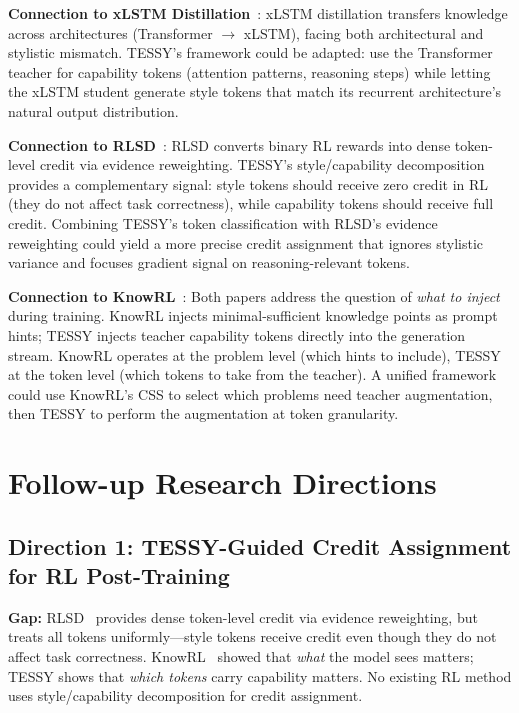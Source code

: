 \documentclass[11pt]{article}
\begin{document}
\textbf{Connection to xLSTM Distillation}~\cite{xlstm}: xLSTM distillation transfers knowledge across architectures (Transformer $\to$ xLSTM), facing both architectural and stylistic mismatch. TESSY's framework could be adapted: use the Transformer teacher for capability tokens (attention patterns, reasoning steps) while letting the xLSTM student generate style tokens that match its recurrent architecture's natural output distribution.

\textbf{Connection to RLSD}~\cite{rlsd}: RLSD converts binary RL rewards into dense token-level credit via evidence reweighting. TESSY's style/capability decomposition provides a complementary signal: style tokens should receive zero credit in RL (they do not affect task correctness), while capability tokens should receive full credit. Combining TESSY's token classification with RLSD's evidence reweighting could yield a more precise credit assignment that ignores stylistic variance and focuses gradient signal on reasoning-relevant tokens.

\textbf{Connection to KnowRL}~\cite{knowrl}: Both papers address the question of \textit{what to inject} during training. KnowRL injects minimal-sufficient knowledge points as prompt hints; TESSY injects teacher capability tokens directly into the generation stream. KnowRL operates at the problem level (which hints to include), TESSY at the token level (which tokens to take from the teacher). A unified framework could use KnowRL's CSS to select which problems need teacher augmentation, then TESSY to perform the augmentation at token granularity.

\section{Follow-up Research Directions}

\subsection{Direction 1: TESSY-Guided Credit Assignment for RL Post-Training}

\textbf{Gap:} RLSD~\cite{rlsd} provides dense token-level credit via evidence reweighting, but treats all tokens uniformly---style tokens receive credit even though they do not affect task correctness. KnowRL~\cite{knowrl} showed that \textit{what} the model sees matters; TESSY shows that \textit{which tokens} carry capability matters. No existing RL method uses style/capability decomposition for credit assignment.
\end{document}
